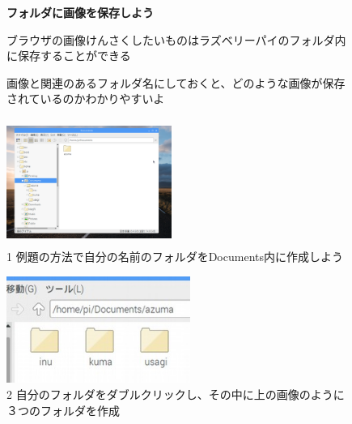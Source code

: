 \documentclass[a4paper,12pt]{jarticle}
\begin{document}
\begin{figure}[t]
\flushleft
{\bfseries
フォルダに画像を保存しよう}

ブラウザの画像けんさくしたいものはラズベリーパイのフォルダ内に保存することができる

画像と関連のあるフォルダ名にしておくと、どのような画像が保存されているのかわかりやすいよ



	\begin{minipage}{\textwidth}
\begin{minipage}{6.582cm}
\includegraphics[width=5.401cm,height=4.152cm]{textbook-img093.png}\\
1 例題の方法で自分の名前のフォルダをDocuments内に作成しよう
\end{minipage}
\begin{minipage}{3.582cm}
\end{minipage}
\begin{minipage}{6.582cm}
\includegraphics[width=5.995cm,height=3.475cm]{textbook-img094.jpg}\\
2 自分のフォルダをダブルクリックし、その中に上の画像のように３つのフォルダを作成
\end{minipage}
	\end{minipage}



\end{figure}
\end{document}
